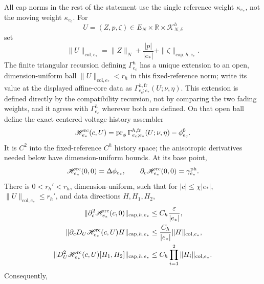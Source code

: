 \begin{lemma}
All cap norms in the rest of the statement use the single reference weight
\(\kappa_{e_*}\), not the moving weight \(\kappa_{e_c}\).  For
\[
 U=(Z,p,\zeta)\in
 E_N\times\mathbb R\times\mathscr K_{N,\delta}^h
\]
set
\begin{equation}
 \|U\|_{\mathrm{col},e_*}
 =\|Z\|_N+\frac{|p|}{|e_*|}
       +\|\zeta\|_{\mathrm{cap},h,e_*}.            \label{eq:nonlinear-collar-data-norm}
\end{equation}
The finite triangular recursion defining \(\Gamma_{e_c}^h\) has a unique
extension to an open, dimension-uniform ball
\(\|U\|_{\mathrm{col},e_*}<r_h\) in this fixed-reference norm;
write its value at the displayed affine-core data as
\(\Gamma_{e_c;e_*}^{h,\mathrm{fr}}(U;\nu,\eta)\).  This extension is
defined directly by the compatibility recursion, not by comparing the two
fading weights, and it agrees with \(\Gamma_{e_c}^h\) wherever both are
defined.  On that open ball define the exact centered voltage-history
assembler
\begin{equation}
 \mathscr H_{e_*}^{\rm rc}(c,U)
 =\operatorname{pr}_\phi
   \Gamma_{e_c;e_*}^{h,\mathrm{fr}}(U;\nu,\eta)
       -\phi_{e_c}^0.                             \label{eq:nonlinear-raw-history-assembler}
\end{equation}
It is \(C^2\) into the fixed-reference \(C^h\) history space; the
anisotropic derivatives needed below have dimension-uniform bounds.  At
its base point,
\begin{equation}
 \mathscr H_{e_*}^{\rm rc}(0,0)=\Delta\phi_{e_*},
 \qquad
 \partial_c\mathscr H_{e_*}^{\rm rc}(0,0)
       =\gamma_{e_*}^{\rm ph}.                    \label{eq:nonlinear-raw-history-first-jets}
\end{equation}
There is \(0<r_h'<r_h\), dimension-uniform, such that for
\(|c|\le\chi|e_*|\), \(\|U\|_{\mathrm{col},e_*}\le r_h'\), and data
directions \(H,H_1,H_2\),
\begin{align}
 \|\partial_c^2\mathscr H_{e_*}^{\rm rc}(c,0)
       \|_{\mathrm{cap},h,e_*}
 &\le C_h\frac{\varepsilon}{|e_*|},\notag\\
 \|\partial_cD_U\mathscr H_{e_*}^{\rm rc}(c,U)H
       \|_{\mathrm{cap},h,e_*}
 &\le \frac{C_h}{|e_*|}\|H\|_{\mathrm{col},e_*},\notag\\
 \|D_U^2\mathscr H_{e_*}^{\rm rc}(c,U)[H_1,H_2]
       \|_{\mathrm{cap},h,e_*}
 &\le C_h\prod_{i=1}^2\|H_i\|_{\mathrm{col},e_*}. \label{eq:nonlinear-raw-history-C2-bounds}
\end{align}
Consequently,
\begin{align}

\end{align}
\end{lemma}

